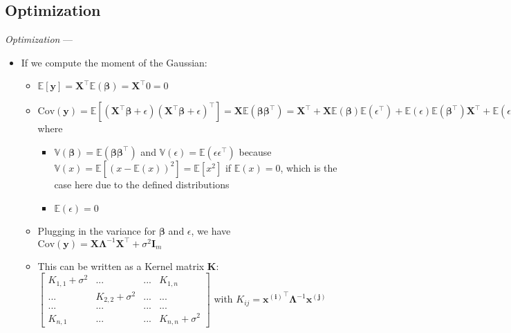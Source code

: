 \subsection*{Optimization}
\emph{Optimization} --- 
\begin{itemize}
    \item If we compute the moment of the Gaussian:
    \begin{itemize}
        \item $\mathbb{E}[\boldsymbol{y}] = \boldsymbol{X}^\intercal \mathbb{E}(\boldsymbol{\beta}) =  \boldsymbol{X}^\intercal 0 = 0$
        \item $\textrm{Cov}(\boldsymbol{y}) = \mathbb{E} [ (\boldsymbol{X}^\intercal \boldsymbol{\beta} + \epsilon) ( 
        \boldsymbol{X}^\intercal \boldsymbol{\beta} + \epsilon )^\intercal ] = \boldsymbol{X} \mathbb{E}(\boldsymbol{\beta} \boldsymbol{\beta}^\intercal) =  \boldsymbol{X}^\intercal + \boldsymbol{X} \mathbb{E}(\boldsymbol{\beta}) \mathbb{E}(\epsilon^\intercal) + \mathbb{E}(\epsilon) \mathbb{E}(\boldsymbol{\beta}^\intercal) \boldsymbol{X}^\intercal + \mathbb{E}(\epsilon \epsilon^\intercal) = 0$ where
        \begin{itemize}
            \item $\mathbb{V}(\boldsymbol{\beta}) = \mathbb{E}(\boldsymbol{\beta} \boldsymbol{\beta}^\intercal)$ and $\mathbb{V}(\epsilon) = \mathbb{E}(\epsilon \epsilon^\intercal)$ because $\mathbb{V}(x) = \mathbb{E}[(x-\mathbb{E}(x))^2] = \mathbb{E}[x^2]$ if $\mathbb{E}(x) = 0$, which is the case here due to the defined distributions
            \item $\mathbb{E}(\epsilon) = 0$ 
        \end{itemize}
        \item Plugging in the variance for $\boldsymbol{\beta}$ and $\epsilon$, we have $\textrm{Cov}(\boldsymbol{y}) = \boldsymbol{X} \boldsymbol{\Lambda}^{-1} \boldsymbol{X}^\intercal + \sigma^2 \boldsymbol{I}_m $
        \item This can be written as a Kernel matrix $\boldsymbol{K}$:
        $\begin{bmatrix}
        K_{1,1} + \sigma^2 & ... & ... & K_{1,n} \\
        ... & K_{2,2} + \sigma^2 & ... & ... \\
        ... & ... & ... & ... \\
        K_{n,1} & ... & ... & K_{n,n} + \sigma^2
        \end{bmatrix}$ with $K_{ij} = \boldsymbol{x^{(i)}}^\intercal \boldsymbol{\Lambda}^{-1} \boldsymbol{x^{(j)}}$

\end{itemize}
\end{itemize}
